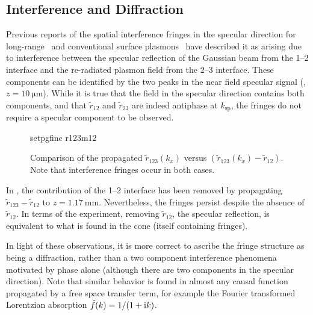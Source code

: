 \subsection{Interference and Diffraction}
Previous reports of the spatial interference fringes in the specular direction
for long-range~\cite{simon2007observation} and conventional surface
plasmons~\cite{schumann2008near} have described it as arising due to
interference between the specular reflection of the Gaussian beam from the
1--2 interface and the re-radiated plasmon field from the 2--3 interface.
These components can be identified by the two peaks in the near field specular
signal (, $z=\SI{10}{\micro\meter}$).  While it is
true that the field in the specular direction contains both components, and
that $\tilde{r}_{12}$ and $\tilde{r}_{23}$ are indeed antiphase at
$k_\text{sp}$, the fringes do not require a specular component to be observed.
\begin{figure}[ht]
	\centering
	{setpgfinc}
	{r123m12}
	\caption{Comparison of the propagated $\tilde{r}_{123}(k_x)$ versus
		$(\tilde{r}_{123}(k_x)-\tilde{r}_{12})$.  Note that interference fringes occur in
		both cases.  }
	\label{fig:r123m12}
\end{figure}

In , the contribution of the 1--2 interface has been
removed by propagating $\tilde{r}_{123}-\tilde{r}_{12}$ to
$z=\SI{1.17}{\milli\meter}$.  Nevertheless, the fringes persist despite the
absence of $\tilde{r}_{12}$.  In terms of the experiment, removing
$\tilde{r}_{12}$, the specular reflection, is equivalent to what is found in
the cone (itself containing fringes).

In light of these observations, it is more correct to ascribe the fringe
structure as being a diffraction, rather than a two component interference
phenomena motivated by phase alone (although there are two components in the
specular direction).  Note that similar behavior is found in almost any causal
function propagated by a free space transfer term, for example the Fourier
transformed Lorentzian absorption $\tilde{f}(k) = 1/(1+{\mathrm{i}} k)$.

